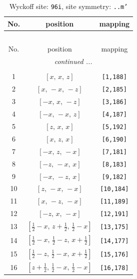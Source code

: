 \documentclass[fleqn,8pt]{jsarticle}
\begin{document}
\begin{longtable}{ccc}
\caption{Wyckoff site: {\tt 96i}, site symmetry: {\tt ..m'}}
 \\
 \hline \hline
No. & position & mapping \\ \hline \endfirsthead

\multicolumn{2}{l}{\tablename\ \thetable{}} \\
 \hline \hline
No. & position & mapping \\ \hline \endhead

 \hline \hline
\multicolumn{2}{r}{\footnotesize\it continued ...} \\ \endfoot

 \hline \hline
\multicolumn{2}{r}{} \\ \endlastfoot

1 & $\left[ x,\, x,\, z \right]$ & {\tt [1,188]} \\ \hline
2 & $\left[ x,\, - x,\, - z \right]$ & {\tt [2,185]} \\ \hline
3 & $\left[ - x,\, x,\, - z \right]$ & {\tt [3,186]} \\ \hline
4 & $\left[ - x,\, - x,\, z \right]$ & {\tt [4,187]} \\ \hline
5 & $\left[ z,\, x,\, x \right]$ & {\tt [5,192]} \\ \hline
6 & $\left[ x,\, z,\, x \right]$ & {\tt [6,190]} \\ \hline
7 & $\left[ - x,\, z,\, - x \right]$ & {\tt [7,181]} \\ \hline
8 & $\left[ - z,\, - x,\, x \right]$ & {\tt [8,183]} \\ \hline
9 & $\left[ - x,\, - z,\, x \right]$ & {\tt [9,182]} \\ \hline
10 & $\left[ z,\, - x,\, - x \right]$ & {\tt [10,184]} \\ \hline
11 & $\left[ x,\, - z,\, - x \right]$ & {\tt [11,189]} \\ \hline
12 & $\left[ - z,\, x,\, - x \right]$ & {\tt [12,191]} \\ \hline
13 & $\left[ \frac{1}{2} - x,\, z + \frac{1}{2},\, \frac{1}{2} - x \right]$ & {\tt [13,175]} \\ \hline
14 & $\left[ \frac{1}{2} - x,\, \frac{1}{2} - z,\, x + \frac{1}{2} \right]$ & {\tt [14,177]} \\ \hline
15 & $\left[ \frac{1}{2} - z,\, \frac{1}{2} - x,\, x + \frac{1}{2} \right]$ & {\tt [15,176]} \\ \hline
16 & $\left[ z + \frac{1}{2},\, \frac{1}{2} - x,\, \frac{1}{2} - x \right]$ & {\tt [16,178]} \\ \hline

\end{longtable}
\end{document}
